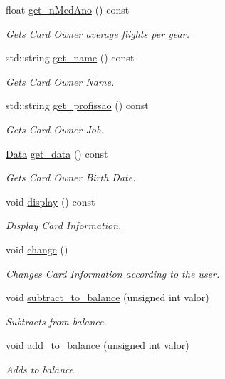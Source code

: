\begin{DoxyCompactItemize}
float \hyperlink{class_cartao_a2001b8921b99f653a8c9c8f3415e0473}{get\+\_\+n\+Med\+Ano} () const
\begin{DoxyCompactList}\small\item\em Gets Card Owner average flights per year. \end{DoxyCompactList}\item 
std\+::string \hyperlink{class_cartao_a82a3f60242054a5639810926f483f637}{get\+\_\+name} () const
\begin{DoxyCompactList}\small\item\em Gets Card Owner Name. \end{DoxyCompactList}\item 
std\+::string \hyperlink{class_cartao_ab15681caa81d97f72a0b83b38ede4416}{get\+\_\+profissao} () const
\begin{DoxyCompactList}\small\item\em Gets Card Owner Job. \end{DoxyCompactList}\item 
\hyperlink{class_data}{Data} \hyperlink{class_cartao_acb31f59f5f21a8f0df638873b615564b}{get\+\_\+data} () const
\begin{DoxyCompactList}\small\item\em Gets Card Owner Birth Date. \end{DoxyCompactList}\item 
\mbox{\label{class_cartao_ab7f19e6cafe67d2fcce4971b0e0d56a9}} 
void \hyperlink{class_cartao_ab7f19e6cafe67d2fcce4971b0e0d56a9}{display} () const
\begin{DoxyCompactList}\small\item\em Display Card Information. \end{DoxyCompactList}\item 
\mbox{\label{class_cartao_a9b2c2d884cc11c0b267fc916a9f5dda6}} 
void \hyperlink{class_cartao_a9b2c2d884cc11c0b267fc916a9f5dda6}{change} ()
\begin{DoxyCompactList}\small\item\em Changes Card Information according to the user. \end{DoxyCompactList}\item 
void \hyperlink{class_cartao_a08bc7512be9ea1ac77d94b8726720816}{subtract\+\_\+to\+\_\+balance} (unsigned int valor)
\begin{DoxyCompactList}\small\item\em Subtracts from balance. \end{DoxyCompactList}\item 
void \hyperlink{class_cartao_ac6436733223b396e673c364f51d306bc}{add\+\_\+to\+\_\+balance} (unsigned int valor)
\begin{DoxyCompactList}\small\item\em Adds to balance. \end{DoxyCompactList}\end{DoxyCompactItemize}


